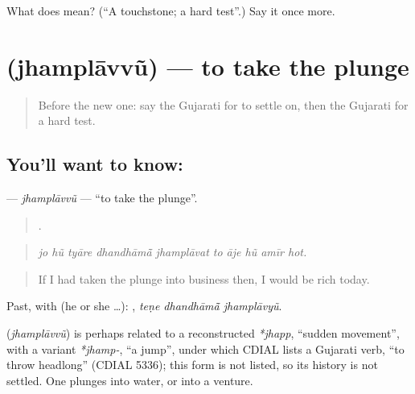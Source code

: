 \begin{tcolorbox}[breakable,colback=teal!4,colframe=teal!35!black,title={Before you move on}]
What does  mean? (\textquotedblleft{}A touchstone; a hard test\textquotedblright{}.) Say it once more.
\end{tcolorbox}
\section[\texorpdfstring{\gu{ઝંપલાવવું} (jhamplāvvũ)}{ઝંપલાવવું (jhamplāvvũ)}]{ (jhamplāvvũ) — to take the plunge}

\label{lesson:GU-C539-jhamplavvu}



\begin{quote}
Before the new one: say the Gujarati for to settle on, then the Gujarati for a hard test.
\end{quote}

\subsection*{You'll want to know: }
\textbf{} — \emph{jhamplāvvũ} — \textquotedblleft{}to take the plunge\textquotedblright{}.

\begin{quote}
         .
\end{quote}

\begin{quote}
\emph{jo hũ tyāre dhandhāmā̃ jhamplāvat to āje hũ amīr hot.}
\end{quote}

\begin{quote}
If I had taken the plunge into business then, I would be rich today.
\end{quote}

Past, with  (he or she …):   , \emph{teṇe dhandhāmā̃ jhamplāvyũ}.

\begin{cousinweb}
\textbf{} (\emph{jhamplāvvũ}) is perhaps related to a reconstructed \emph{*jhapp}, \textquotedblleft{}sudden movement\textquotedblright{}, with a variant \emph{*jhamp-}, \textquotedblleft{}a jump\textquotedblright{}, under which CDIAL lists a Gujarati verb, \textquotedblleft{}to throw headlong\textquotedblright{} (CDIAL 5336); this form is not listed, so its history is not settled. One plunges into water, or into a venture.
\end{cousinweb}


